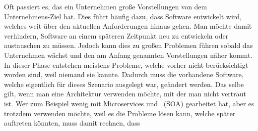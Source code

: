 Oft passiert es, das ein Unternehmen große Vorstellungen von dem Unternehmens-Ziel hat. Dies führt häufig dazu, dass Software entwickelt wird, welches weit über den aktuellen Anforderungen hinaus gehen. Man möchte damit verhindern, Software an einem späteren Zeitpunkt neu zu entwickeln oder austauschen zu müssen. Jedoch kann dies zu großen Problemen führen sobald das Unternehmen wächst und den am Anfang genannten Vorstellungen näher kommt. In dieser Phase entstehen meistens Probleme, welche vorher nicht berücksichtigt worden sind, weil niemand sie kannte. Dadurch muss die vorhandene Software, welche eigentlich für dieses Szenario ausgelegt war, geändert werden.
Das selbe gilt, wenn man eine Architektur verwenden möchte, mit der man nicht vertraut ist. Wer zum Beispiel wenig mit Microservices und \SOA\ (SOA) gearbeitet hat, aber es trotzdem verwenden möchte, weil es die Probleme lösen kann, welche später auftreten könnten, muss damit rechnen, dass 

